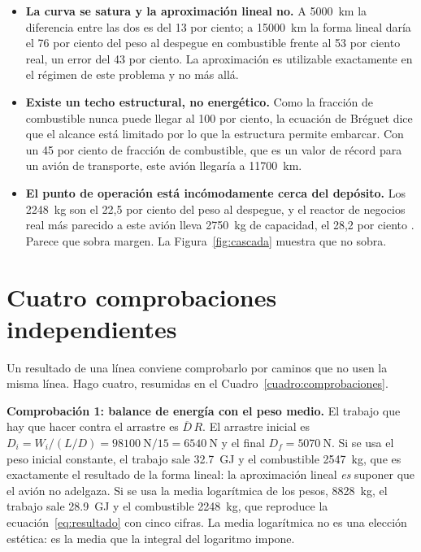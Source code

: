 \documentclass[11pt,letterpaper]{article}
\begin{document}
\begin{itemize}
\item \textbf{La curva se satura y la aproximación lineal no.} A
  \SI{5000}{\kilo\meter} la diferencia entre las dos es del 13 por ciento; a
  \SI{15000}{\kilo\meter} la forma lineal daría el 76 por ciento del peso al
  despegue en combustible frente al 53 por ciento real, un error del 43 por
  ciento. La aproximación es utilizable exactamente en el régimen de este
  problema y no más allá.
\item \textbf{Existe un techo estructural, no energético.} Como la fracción de
  combustible nunca puede llegar al 100 por ciento, la ecuación de Bréguet dice
  que el alcance está limitado por lo que la estructura permite embarcar. Con
  un 45 por ciento de fracción de combustible, que es un valor de récord para
  un avión de transporte, este avión llegaría a \SI{11700}{\kilo\meter}.
\item \textbf{El punto de operación está incómodamente cerca del depósito.}
  Los \SI{2248}{\kilogram} son el 22,5 por ciento del peso al despegue, y el
  reactor de negocios real más parecido a este avión lleva
  \SI{2750}{\kilogram} de capacidad, el 28,2 por ciento
  \parencite{learjet75,aopalearjet}. Parece que sobra margen. La
  Figura~\ref{fig:cascada} muestra que no sobra.
\end{itemize}

\section{Cuatro comprobaciones independientes}

Un resultado de una línea conviene comprobarlo por caminos que no usen la
misma línea. Hago cuatro, resumidas en el Cuadro~\ref{cuadro:comprobaciones}.

\textbf{Comprobación 1: balance de energía con el peso medio.} El trabajo que
hay que hacer contra el arrastre es \(\overline{D}\,R\). El arrastre inicial es
\(D_i = W_i/(L/D) = \SI{98100}{\newton}/15 = \SI{6540}{\newton}\) y el final
\(D_f = \SI{5070}{\newton}\). Si se usa el peso inicial constante, el trabajo
sale \SI{32.7}{\giga\joule} y el combustible \SI{2547}{\kilogram}, que es
exactamente el resultado de la forma lineal: la aproximación lineal
\emph{es} suponer que el avión no adelgaza. Si se usa la media logarítmica de
los pesos, \SI{8828}{\kilogram}, el trabajo sale \SI{28.9}{\giga\joule} y el
combustible \SI{2248}{\kilogram}, que reproduce la
ecuación~\eqref{eq:resultado} con cinco cifras. La media logarítmica no es una
elección estética: es la media que la integral del logaritmo impone.
\end{document}
